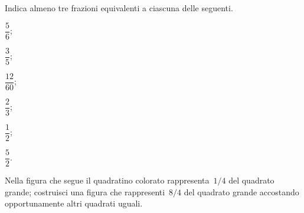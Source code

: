 \begin{esercizio}
 \label{ese:3.7}
 Indica almeno tre frazioni equivalenti a ciascuna delle seguenti.
 \begin{multicols}{6}
 \begin{enumeratea}
 	\item $\dfrac{5}{6}$;
 	\item $\dfrac{3}{5}$;
 	\item $\dfrac{12}{60}$;
 	\item $\dfrac{2}{3}$;
 	\item $\dfrac{1}{2}$;
 	\item $\dfrac{5}{2}$.
 \end{enumeratea}
 \end{multicols}
\end{esercizio}

\begin{esercizio}
 \label{ese:3.8}
Nella figura che segue il quadratino colorato rappresenta~$1/4$ del quadrato grande; costruisci una figura
che rappresenti~$8/4$ del quadrato grande accostando opportunamente altri quadrati uguali.
 \begin{center}
 
 \end{center}
\end{esercizio}

